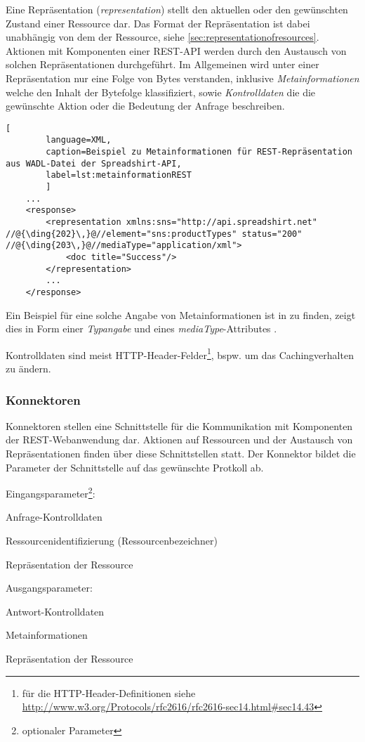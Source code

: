 Eine Repräsentation (\emph{representation}) stellt den aktuellen oder den gewünschten Zustand einer Ressource dar. Das Format der Repräsentation ist dabei unabhängig von dem der Ressource, siehe \cref{sec:representationofresources}.
Aktionen mit Komponenten einer REST-API werden durch den Austausch von solchen Repräsentationen durchgeführt.
Im Allgemeinen wird unter einer Repräsentation nur eine Folge von Bytes verstanden, inklusive \emph{Metainformationen} welche den Inhalt der Bytefolge klassifiziert, sowie \emph{Kontrolldaten} die die gewünschte Aktion oder die Bedeutung der Anfrage beschreiben.

\begin{minipage}{\textwidth}
    \begin{lstlisting}[
        language=XML,
        caption=Beispiel zu Metainformationen für REST-Repräsentation aus WADL-Datei der Spreadshirt-API,
        label=lst:metainformationREST
        ]
    ...
    <response>
        <representation xmlns:sns="http://api.spreadshirt.net" //@{\ding{202}\,}@//element="sns:productTypes" status="200" //@{\ding{203\,}@//mediaType="application/xml">
            <doc title="Success"/>
        </representation>
        ...
    </response>
    \end{lstlisting}
\end{minipage}

Ein Beispiel für eine solche Angabe von Metainformationen ist in  zu finden,  zeigt dies in Form einer \emph{Typangabe} und eines \emph{mediaType}-Attributes .

Kontrolldaten sind meist HTTP-Header-Felder\footnote{für die HTTP-Header-Definitionen siehe \url{http://www.w3.org/Protocols/rfc2616/rfc2616-sec14.html\#sec14.43}}, bspw. um das Cachingverhalten zu ändern.

\subsubsection{Konnektoren}

Konnektoren stellen eine Schnittstelle für die Kommunikation mit Komponenten der REST-Webanwendung dar. Aktionen auf Ressourcen und der Austausch von Repräsentationen finden über diese Schnittstellen statt. Der Konnektor bildet die Parameter der Schnittstelle auf das gewünschte Protkoll ab.

Eingangsparameter\footnote{\textperiodcentered optionaler Parameter}:
\begin{compactitem}
    \item Anfrage-Kontrolldaten
    \item Ressourcenidentifizierung (Ressourcenbezeichner)
    \item[\textperiodcentered] Repräsentation der Ressource
\end{compactitem}
Ausgangsparameter:
\begin{compactitem}
    \item Antwort-Kontrolldaten
    \item[\textperiodcentered] Metainformationen
    \item[\textperiodcentered] Repräsentation der Ressource
\end{compactitem}

